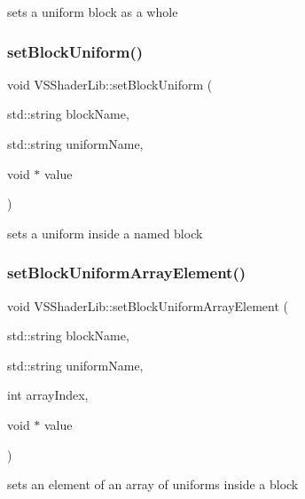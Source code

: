 sets a uniform block as a whole 

\mbox{\label{class_v_s_shader_lib_a456c9e16b026780dfa62d669b495b877}} 
\subsubsection{\texorpdfstring{set\+Block\+Uniform()}{setBlockUniform()}}
{\footnotesize\ttfamily void V\+S\+Shader\+Lib\+::set\+Block\+Uniform (\begin{DoxyParamCaption}\item[{std\+::string}]{block\+Name,  }\item[{std\+::string}]{uniform\+Name,  }\item[{void $\ast$}]{value }\end{DoxyParamCaption})\hspace{0.3cm}{\ttfamily [static]}}



sets a uniform inside a named block 

\mbox{\label{class_v_s_shader_lib_a91bc939218a7718b9dbb7e13cb9d842d}} 
\subsubsection{\texorpdfstring{set\+Block\+Uniform\+Array\+Element()}{setBlockUniformArrayElement()}}
{\footnotesize\ttfamily void V\+S\+Shader\+Lib\+::set\+Block\+Uniform\+Array\+Element (\begin{DoxyParamCaption}\item[{std\+::string}]{block\+Name,  }\item[{std\+::string}]{uniform\+Name,  }\item[{int}]{array\+Index,  }\item[{void $\ast$}]{value }\end{DoxyParamCaption})\hspace{0.3cm}{\ttfamily [static]}}



sets an element of an array of uniforms inside a block 


